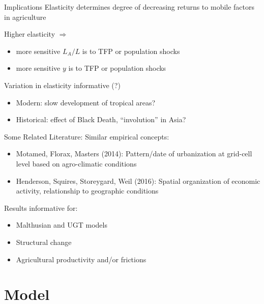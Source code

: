 \documentclass[10pt, xcolor=dvipsnames]{beamer}
\begin{document}
\begin{frame}{Implications}
Elasticity determines degree of decreasing returns to mobile factors in agriculture

\vspace{.2cm} Higher elasticity $\Rightarrow$
\begin{itemize}
  \item more sensitive $L_A/L$ is to TFP or population shocks
  \item more sensitive $y$ is to TFP or population shocks
\end{itemize}

\vspace{.2cm} Variation in elasticity informative (?)
\begin{itemize}
  \item Modern: slow development of tropical areas?  
  \item Historical: effect of Black Death, ``involution'' in Asia?
\end{itemize}

\end{frame}

\begin{frame}{Some Related Literature:}
Similar empirical concepts:
\begin{itemize}
  \item Motamed, Florax, Masters (2014): Pattern/date of urbanization at grid-cell level based on agro-climatic conditions
  \item Henderson, Squires, Storeygard, Weil (2016): Spatial organization of economic activity, relationship to geographic conditions
\end{itemize}
Results informative for:
\begin{itemize}
  \item Malthusian and UGT models
  \item Structural change
  \item Agricultural productivity and/or frictions
\end{itemize}

\end{frame}

\section{Model}
\end{document}
